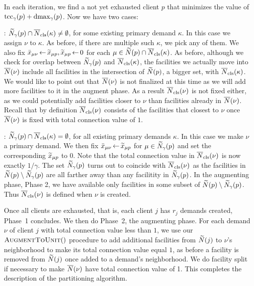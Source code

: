 \documentclass{llncs}
\begin{document}
In each iteration, we find a not yet exhausted client $p$ that minimizes the
value of $\textrm{tcc}_\gamma(p) + \text{dmax}_\gamma(p)$. Now we have two cases:

\begin{description}

\item{:} ${\widetilde N}_{\gamma}(p) \cap
  {\overline{N}}_{\text{cls}}(\kappa)\neq\emptyset$, for some existing primary demand
  $\kappa$.  In this case we assign $\nu$ to $\kappa$. As before, if
  there are multiple such $\kappa$, we pick any of them. We also fix
  ${\bar x}_{\mu \nu} {\,\leftarrow\,} {\widetilde x}_{\mu p}, {\widetilde x}_{\mu p}{\,\leftarrow\,} 0$
  for each $\mu \in {\widetilde N}(p)\cap {\overline{N}}_{\text{cls}}(\kappa)$. As before,
  although we check for overlap between ${\widetilde N}_{\gamma}(p)$ and
  ${\overline{N}}_{\text{cls}}(\kappa)$, the facilities we actually move into
  ${\overline{N}}(\nu)$ include all facilities in the intersection of
  ${\widetilde N}(p)$, a bigger set, with ${\overline{N}}_{\text{cls}}(\kappa)$. We would
  like to point out that ${\overline{N}}(\nu)$ is not finalized at this time
  as we will add more facilities to it in the augment phase. As a
  result ${\overline{N}}_{\text{cls}}(\nu)$ is not fixed either, as we could
  potentially add facilities closer to $\nu$ than facilities already
  in ${\overline{N}}(\nu)$. Recall that by definition ${\overline{N}}_{\text{cls}}(\nu)$
  consists of the facilities that closest to $\nu$ once ${\overline{N}}(\nu)$
  is fixed with total connection value of $1$.

\item{:} ${\widetilde N}_{\gamma}(p) \cap {\overline{N}}_{\text{cls}}(\kappa) =
  \emptyset$, for all existing primary demands $\kappa$.  In this case
  we make $\nu$ a primary demand. We then fix ${\bar x}_{\mu \nu}{\,\leftarrow\,}
  {\widetilde x}_{\mu p}$ for $\mu \in {\widetilde N}_{\gamma}(p)$ and set the
  corresponding ${\widetilde x}_{\mu p}$ to $0$.  Note that the total
  connection value in ${\overline{N}}_{\text{cls}}(\nu)$ is now exactly $1/\gamma$.
  The set ${\widetilde N}_{\gamma}(p)$ turns out to coincide with
  ${\overline{N}}_{\text{cls}}(\nu)$ as the facilities in ${\widetilde N}(p) \setminus
  {\widetilde N}_{\gamma}(p)$ are all farther away than any facilitity in
  ${\widetilde N}_{\gamma}(p)$. In the augmenting phase, Phase 2, we have
  available only facilities in some subset of ${\widetilde N}(p) \setminus
  {\widetilde N}_{\gamma}(p)$. Thus ${\overline{N}}_{\text{cls}}(\nu)$ is defined when $\nu$
  is created.
\end{description}

Once all clients are exhausted, that is, each client $j$ has $r_j$
demands created, Phase~1 concludes. We then do Phase~2, the augmenting
phase.  For each demand $\nu$ of client $j$ with total connection
value less than $1$, we use our ${\textsc{AugmentToUnit}}()$ procedure to add
additional facilities from ${\widetilde N}(j)$ to $\nu$'s neighborhood to
make its total connection value equal $1$, as before a facility is
removed from ${\widetilde N}(j)$ once added to a demand's neighborhood. We
do facility split if necessary to make ${\overline{N}}(\nu)$ have total
connection value of 1.  This completes the description of the
partitioning algorithm.
\end{document}
